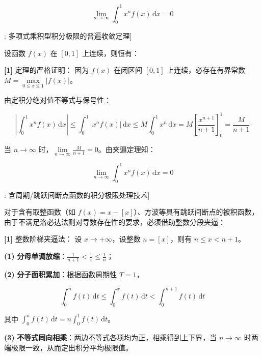 \documentclass[11pt,a4paper,UTF8]{ctexart}
\begin{document}
\begin{equation*}
\lim_{n\to\infty}\int_0^1 x^n f(x)\,\mathrm{d}x = 0
\end{equation*}
\begin{thmbox}[定理[3]: 多项式乘积型积分极限的普遍收敛定理]

设函数 $f(x)$ 在 $[0, 1]$ 上连续，则恒有：


\textbf{[1]} 定理的严格证明：
因为 $f(x)$ 在闭区间 $[0, 1]$ 上连续，必存在有界常数 $M = \max\limits_{0\leqslant x\leqslant 1}|f(x)|$。

由定积分绝对值不等式与保号性：


\begin{equation*}
\left|\int_0^1 x^n f(x)\,\mathrm{d}x\right| \leqslant \int_0^1 |x^n f(x)|\,\mathrm{d}x \leqslant M\int_0^1 x^n\,\mathrm{d}x = M\left[\frac{x^{n+1}}{n+1}\right]_0^1 = \frac{M}{n+1}
\end{equation*}


当 $n \to \infty$ 时，$\lim\limits_{n\to\infty}\frac{M}{n+1} = 0$。由夹逼定理知：


\begin{equation*}
\lim_{n\to\infty}\int_0^1 x^n f(x)\,\mathrm{d}x = 0
\end{equation*}


\end{thmbox}
\begin{thmbox}[方法[2]: 含周期/跳跃间断点函数的积分极限处理技术]

对于含有取整函数（如 $f(x) = x - [x]$）、方波等具有跳跃间断点的被积函数，由于不满足洛必达法则对导数存在性的要求，必须借助整数分段夹逼：

\textbf{[1]} 整数阶梯夹逼法：
设 $x \to +\infty$，设整数 $n = [x]$，则有 $n \leqslant x < n+1$。

\textbf{(1)}  \textbf{分母单调放缩}：$\frac{1}{n+1} < \frac{1}{x} \leqslant \frac{1}{n}$；

\textbf{(2)}  \textbf{分子面积累加}：根据函数周期性 $T = 1$，


\begin{equation*}
\int_0^n f(t)\,\mathrm{d}t \leqslant \int_0^x f(t)\,\mathrm{d}t < \int_0^{n+1} f(t)\,\mathrm{d}t
\end{equation*}


其中 $\int_0^n f(t)\,\mathrm{d}t = n\int_0^1 f(t)\,\mathrm{d}t$。

\textbf{(3)}  \textbf{不等式同向相乘}：两边不等式各项均为正，相乘得到上下界，当 $n \to \infty$ 时两端极限一致，从而定出积分平均极限值。

\end{thmbox}
\end{document}
